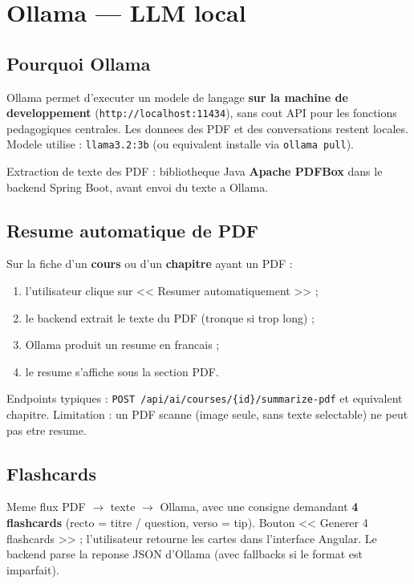 \section{Ollama --- LLM local}

\subsection{Pourquoi Ollama}

Ollama permet d'executer un modele de langage \textbf{sur la machine de
developpement} (\texttt{http://localhost:11434}), sans cout API pour les
fonctions pedagogiques centrales. Les donnees des PDF et des conversations
restent locales. Modele utilise : \texttt{llama3.2:3b} (ou equivalent
installe via \texttt{ollama pull}).

Extraction de texte des PDF : bibliotheque Java \textbf{Apache PDFBox}
dans le backend Spring Boot, avant envoi du texte a Ollama.

\subsection{Resume automatique de PDF}

Sur la fiche d'un \textbf{cours} ou d'un \textbf{chapitre} ayant un PDF :
\begin{enumerate}
  \item l'utilisateur clique sur << Resumer automatiquement >> ;
  \item le backend extrait le texte du PDF (tronque si trop long) ;
  \item Ollama produit un resume en francais ;
  \item le resume s'affiche sous la section PDF.
\end{enumerate}
Endpoints typiques :
\texttt{POST /api/ai/courses/\{id\}/summarize-pdf} et equivalent chapitre.
Limitation : un PDF scanne (image seule, sans texte selectable) ne peut pas
etre resume.

\subsection{Flashcards}

Meme flux PDF $\rightarrow$ texte $\rightarrow$ Ollama, avec une consigne
demandant \textbf{4 flashcards} (recto = titre / question, verso = tip).
Bouton << Generer 4 flashcards >> ; l'utilisateur retourne les cartes dans
l'interface Angular. Le backend parse la reponse JSON d'Ollama (avec
fallbacks si le format est imparfait).

